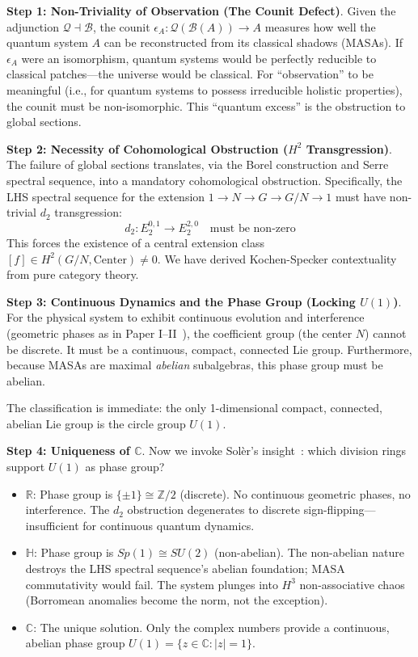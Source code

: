 \documentclass[11pt]{article}
\begin{document}
\textbf{Step 1: Non-Triviality of Observation (The Counit Defect)}.
Given the adjunction $\mathcal{Q} \dashv \mathcal{B}$, the counit $\epsilon_A: \mathcal{Q}(\mathcal{B}(A)) \to A$ measures how well the quantum system $A$ can be reconstructed from its classical shadows (MASAs). If $\epsilon_A$ were an isomorphism, quantum systems would be perfectly reducible to classical patches---the universe would be classical. For ``observation'' to be meaningful (i.e., for quantum systems to possess irreducible holistic properties), the counit must be non-isomorphic. This ``quantum excess'' is the obstruction to global sections.

\textbf{Step 2: Necessity of Cohomological Obstruction ($H^2$ Transgression)}.
The failure of global sections translates, via the Borel construction and Serre spectral sequence, into a mandatory cohomological obstruction. Specifically, the LHS spectral sequence for the extension $1 \to N \to G \to G/N \to 1$ must have non-trivial $d_2$ transgression:
\[
d_2: E_2^{0,1} \to E_2^{2,0} \quad \text{must be non-zero}
\]
This forces the existence of a central extension class $[f] \in H^2(G/N, \text{Center}) \neq 0$. We have derived Kochen-Specker contextuality from pure category theory.

\textbf{Step 3: Continuous Dynamics and the Phase Group (Locking $U(1)$)}.
For the physical system to exhibit continuous evolution and interference (geometric phases as in Paper I--II~\cite{PaperI,PaperII}), the coefficient group (the center $N$) cannot be discrete. It must be a continuous, compact, connected Lie group. Furthermore, because MASAs are maximal \textit{abelian} subalgebras, this phase group must be abelian.

The classification is immediate: the only 1-dimensional compact, connected, abelian Lie group is the circle group $U(1)$.

\textbf{Step 4: Uniqueness of $\mathbb{C}$}.
Now we invoke Sol\`{e}r's insight~\cite{Soler1995}: which division rings support $U(1)$ as phase group?
\begin{itemize}
\item $\mathbb{R}$: Phase group is $\{\pm 1\} \cong \mathbb{Z}/2$ (discrete). No continuous geometric phases, no interference. The $d_2$ obstruction degenerates to discrete sign-flipping---insufficient for continuous quantum dynamics.
\item $\mathbb{H}$: Phase group is $Sp(1) \cong SU(2)$ (non-abelian). The non-abelian nature destroys the LHS spectral sequence's abelian foundation; MASA commutativity would fail. The system plunges into $H^3$ non-associative chaos (Borromean anomalies become the norm, not the exception).
\item $\mathbb{C}$: The unique solution. Only the complex numbers provide a continuous, abelian phase group $U(1) = \{z \in \mathbb{C} : |z| = 1\}$.
\end{itemize}
\end{document}
